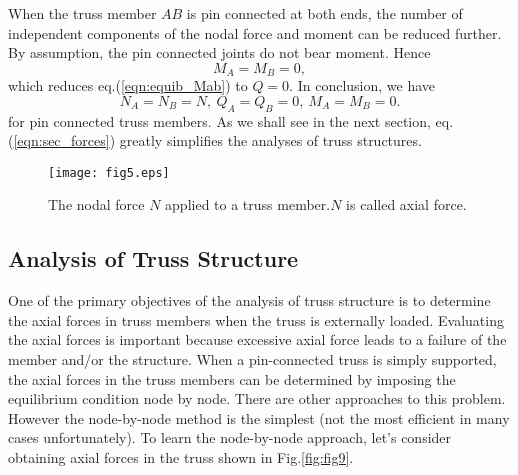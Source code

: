 ﻿\documentclass[10pt,a4j]{article}
\begin{document}
When the truss member $AB$ is pin connected at both ends, the 
number of independent components of the nodal force and moment can be reduced further. 
By assumption, the pin connected joints do not bear moment. Hence   
\begin{equation}
		M_A=M_B=0, 
	\label{eqn:}
\end{equation}
which reduces eq.(\ref{eqn:equib_Mab}) to $Q=0$.
In conclusion, we have 
\begin{equation}
	N_A=N_B=N,\  Q_A=Q_B=0, \  M_A=M_B=0.
	\label{eqn:sec_forces}
\end{equation}
for pin connected truss members.  
As we shall see in the next section, eq.(\ref{eqn:sec_forces}) greatly simplifies the analyses of truss structures. 
\begin{figure}[h]
	\begin{center}
	\texttt{[image: fig5.eps]} 
	\end{center}
	\caption{The nodal force $N$ applied to a truss member.$N$ is called axial force.}
	\label{fig:fig5}
\end{figure}
%
%
\subsection{Analysis of Truss Structure}
One of the primary objectives of the analysis of truss structure is to determine 
the axial forces in truss members when the truss is externally loaded. 
Evaluating the axial forces is important because excessive axial force leads to a  
failure of the member and/or the structure. When a pin-connected truss is simply supported, 
the axial forces in the truss members can be determined by imposing the equilibrium condition 
node by node. There are other approaches to this problem.  
However the node-by-node method is the simplest (not the most efficient in many cases unfortunately). 
To learn the node-by-node approach, let's consider obtaining axial forces in the truss shown in 
Fig.\ref{fig:fig9}.\\ 
\end{document}
